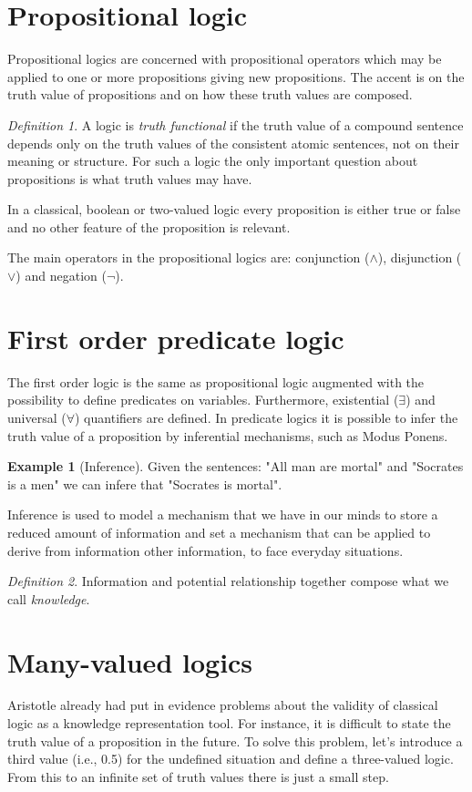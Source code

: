 \documentclass[12pt, a4paper]{report}
\theoremstyle{remark}
\newtheorem*{remark}{Definition}
\theoremstyle{definition}
\newtheorem{example}{Example}
\begin{document}
    \section{Propositional logic}
    Propositional logics are concerned with propositional operators which may be applied to one or more propositions giving new propositions.
    The accent is on the truth value of propositions and on how these truth values are composed.
    \begin{remark}
        A logic is \emph{truth functional} if the truth value of a compound sentence depends only on the truth values of the consistent atomic 
        sentences, not on their meaning or structure. For such a logic the only important question about propositions is what truth values may
        have.
    \end{remark}
    In a classical, boolean or two-valued logic every proposition is either true or false and no other feature of the proposition is relevant.

    The main operators in the propositional logics are: conjunction ($\land$), disjunction ($\lor$) and negation ($\lnot$).

    \section{First order predicate logic}
    The first order logic is the same as propositional logic augmented with the possibility to define predicates on variables. Furthermore, 
    existential ($\exists$) and universal ($\forall$) quantifiers are defined. 
    In predicate logics it is possible to infer the truth value of a proposition by inferential mechanisms, such as Modus Ponens. 
    \begin{example}[Inference]
        Given the sentences: "All man are mortal" and "Socrates is a men" we can infere that "Socrates is mortal".
    \end{example}
    Inference is used to model a mechanism that we have in our minds to store a reduced amount of information and set a mechanism that can be 
    applied to derive from information other information, to face everyday situations.
    \begin{remark}
        Information and potential relationship together compose what we call \emph{knowledge}.
    \end{remark}
    
    \section{Many-valued logics}
    Aristotle already had put in evidence problems about the validity of classical logic as a knowledge representation tool. For instance, it is
    difficult to state the truth value of a proposition in the future. To solve this problem, let's introduce a third value (i.e., 0.5) for the 
    undefined situation and define a three-valued logic. From this to an infinite set of truth values there is just a small step.
    
\end{document}

